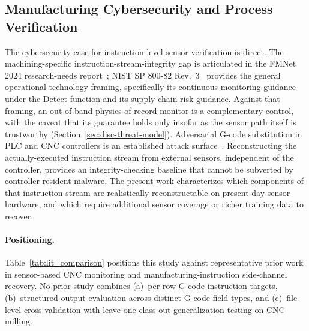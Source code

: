\documentclass[sensors,article,submit,moreauthors,pdftex]{Definitions/mdpi}
\begin{document}
\subsection{Manufacturing Cybersecurity and Process Verification}
\label{sec:related-security}

The cybersecurity case for instruction-level sensor verification is direct. The machining-specific instruction-stream-integrity gap is articulated in the FMNet 2024 research-needs report~\cite{nist2024fmnet}; NIST SP 800-82 Rev.~3~\cite{nist2023sp80082} provides the general operational-technology framing, specifically its continuous-monitoring guidance under the Detect function and its supply-chain-risk guidance. Against that framing, an out-of-band physics-of-record monitor is a complementary control, with the caveat that its guarantee holds only insofar as the sensor path itself is trustworthy (Section~\ref{sec:disc-threat-model}). Adversarial G-code substitution in PLC and CNC controllers is an established attack surface~\cite{zonouz2014plc,sturm2014cyber,yampolskiy2018security,kimmell2025cnc,belikovetsky2017drowned}. Reconstructing the actually-executed instruction stream from external sensors, independent of the controller, provides an integrity-checking baseline that cannot be subverted by controller-resident malware. The present work characterizes which components of that instruction stream are realistically reconstructable on present-day sensor hardware, and which require additional sensor coverage or richer training data to recover.

\paragraph{Positioning.} Table~\ref{tab:lit_comparison} positions this study against representative prior work in sensor-based CNC monitoring and manufacturing-instruction side-channel recovery.\label{sec:related-comparison} No prior study combines (a)~per-row G-code instruction targets, (b)~structured-output evaluation across distinct G-code field types, and (c)~file-level cross-validation with leave-one-class-out generalization testing on CNC milling.
\end{document}
